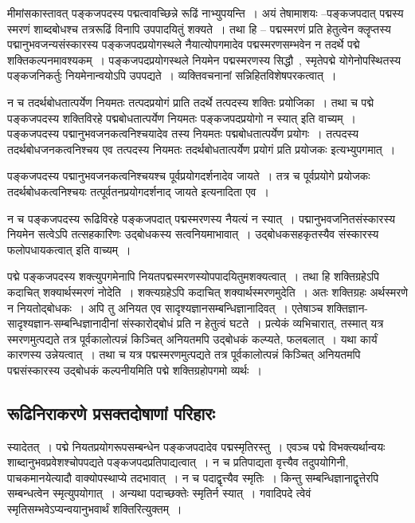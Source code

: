 			मीमांसकास्तावत् पङ्कजपदस्य पद्मत्वावच्छिन्ने रूढिं नाभ्युपयन्ति~।  अयं तेषामाशयः –पङ्कजपदात् पद्मस्य स्मरणं शाब्दबोधश्च तत्ररूढिं विनापि उपपादयितुं शक्यते~।  तथा हि – पद्मस्मरणं प्रति हेतुत्वेन  क्लॄप्तस्य पद्मानुभवजन्यसंस्कारस्य पङ्कजपदप्रयोगस्थले नैयात्योपगमादेव पद्मस्मरणसम्भवेन न तदर्थे पद्मे शक्तिकल्पनमावश्यकम्~।  पङ्कजपदप्रयोगस्थले नियमेन पद्मस्मरणस्य सिद्धौ~, स्मृतेपद्मे योगेनोपस्थितस्य पङ्कजनिकर्तुः नियमेनान्वयोऽपि उपपद्यते~।  व्यक्तिवचनानां सन्निहितविशेषपरकत्वात्~।  

			न च तदर्थबोधतात्पर्येण नियमतः तत्पदप्रयोगं प्राति तदर्थे तत्पदस्य शक्तिः प्रयोजिका~। तथा च पद्मे पङ्कजपदस्य शक्तिविरहे पद्मबोधतात्पर्येण नियमतः पङ्कजपदप्रयोगो न स्यात् इति वाच्यम्~।  पङ्कजपदस्य पद्मानुभवजनकत्वनिश्चयादेव तस्य नियमतः पद्मबोधतात्पर्येण प्रयोगः~।  तत्पदस्य तदर्थबोधजनकत्वनिश्चय एव तत्पदस्य नियमतः तदर्थबोधतात्पर्येण प्रयोगं प्रति प्रयोजकः इत्यभ्युपगमात्~।

			पङ्कजपदस्य पद्मानुभवजनकत्वनिश्चयश्च पूर्वप्रयोगदर्शनादेव जायते~।  तत्र च पूर्वप्रयोगे प्रयोजकः  तदर्थबोधकत्वनिश्चयः तत्पूर्वतनप्रयोगदर्शनाद् जायते इत्यनादिता एव~। 

			न च पङ्कजपदस्य रूढिविरहे पङ्कजपदात् पद्मस्मरणस्य नैयत्यं न स्यात्~।  पद्मानुभवजनितसंस्कारस्य नियमेन सत्वेऽपि तत्सहकारिणः उद्बोधकस्य सत्वनियमाभावात्~।  उद्बोधकसहकृतस्यैव संस्कारस्य फलोपधायकत्वात् इति वाच्यम्~। 

			पद्मे पङ्कजपदस्य शक्त्युपगमेनापि नियतपद्मस्मरणस्योपपादयितुमशक्यत्वात्~।  तथा हि शक्तिग्रहेऽपि कदाचित् शक्यार्थस्मरणं नोदेति~।  शक्त्यग्रहेऽपि कदाचित् शक्यार्थस्मरणमुदेति~।  अतः शक्तिग्रहः अर्थस्मरणे न नियतोद्बोधकः~।  अपि तु अनियत एव सादृश्यज्ञानसम्बन्धिज्ञानादिवत्~।  एतेषाञ्च  शक्तिज्ञान-सादृश्यज्ञान-सम्बन्धिज्ञानादीनां संस्कारोद्बोधं प्रति न हेतुत्वं घटते~।  प्रत्येकं व्यभिचारात्, तस्मात् यत्र स्मरणमुत्पद्यते तत्र पूर्वकालोत्पन्नं किञ्चित् अनियतमपि उद्बोधकं कल्प्यते, फलबलात्~।  यथा कार्यं कारणस्य उन्नेयत्वात्~।  तथा च यत्र पद्मस्मरणमुत्पद्यते तत्र पूर्वकालोत्पन्नं किञ्चित् अनियतमपि पद्मसंस्कारस्य उद्बोधकं कल्पनीयमिति पद्मे शक्तिग्रहोपगमो व्यर्थः~। 

		\subsection{रूढिनिराकरणे प्रसक्तदोषाणां परिहारः}

			\begin{small}
				
				स्यादेतत्~। पद्मे नियतप्रयोगरूपसम्बन्धेन पङ्कजपदादेव पद्मस्मृतिरस्तु~। एवञ्च पद्मे विभक्त्यर्थान्वयः शाब्दानुभवप्रवेशश्चोपपद्यते पङ्कजपदप्रतिपाद्यत्वात्~। न च प्रतिपाद्यता वृत्त्यैव तदुपयोगिनी, पाचकमानयेत्यादौ वाक्योपस्थाप्ये तदभावात्~। न च पदाद्वृत्त्यैव स्मृतिः~। किन्तु सम्बन्धिज्ञानाद्वृत्तेरपि सम्बन्धत्वेन स्मृत्युपयोगात्~। अन्यथा पदाच्छक्तेः स्मृतिर्न स्यात्~। गवादिपदे त्वेवं स्मृतिसम्भवेऽप्यन्वयानुभवार्थं शक्तिरित्युक्तम्~। 
			\end{small}
			
